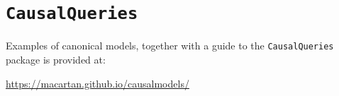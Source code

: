 \documentclass[
  12pt,
]{book}
\begin{document}
\hypertarget{examplesappendix}{%
\chapter{\texorpdfstring{\texttt{CausalQueries}}{CausalQueries}}\label{examplesappendix}}

Examples of canonical models, together with a guide to the \texttt{CausalQueries} package is provided at:

\url{https://macartan.github.io/causalmodels/}

  
\end{document}
